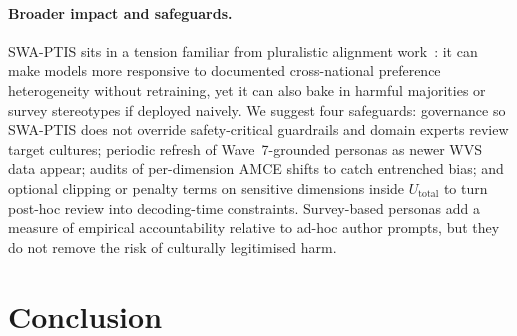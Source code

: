 \documentclass{article}
\begin{document}
\paragraph{Broader impact and safeguards.}
SWA-PTIS sits in a tension familiar from pluralistic alignment
work~\citep{sorensen2024roadmap}: it can make models more responsive to
documented cross-national preference heterogeneity without retraining, yet it
can also bake in harmful majorities or survey stereotypes if deployed naively.
We suggest four safeguards: governance so SWA-PTIS does not override
safety-critical guardrails and domain experts review target cultures; periodic
refresh of Wave~7-grounded personas as newer WVS data appear; audits of
per-dimension AMCE shifts to catch entrenched bias; and optional clipping or
penalty terms on sensitive dimensions inside $U_{\text{total}}$ to turn
post-hoc review into decoding-time constraints.
Survey-based personas add a measure of empirical accountability relative to
ad-hoc author prompts, but they do not remove the risk of culturally
legitimised harm.

\section{Conclusion}
\label{sec:conclusion}
\end{document}
